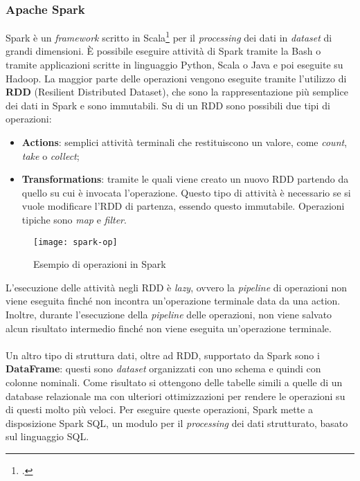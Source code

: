 \subsubsection{Apache Spark}
Spark è un \textit{framework} scritto in Scala\footcite{https://www.scala-lang.org/} per il \textit{processing} dei dati in \textit{dataset} di grandi dimensioni.
È possibile eseguire attività di Spark tramite la \gls{Bash} o tramite applicazioni scritte in linguaggio Python, Scala o Java e poi eseguite su Hadoop.
La maggior parte delle operazioni vengono eseguite tramite l'utilizzo di \textbf{RDD} (Resilient Distributed Dataset), che sono la rappresentazione più semplice dei dati in Spark e sono immutabili. Su di un RDD sono possibili due tipi di operazioni:
\begin{itemize}
	\item \textbf{Actions}: semplici attività terminali che restituiscono un valore, come \textit{count}, \textit{take} o \textit{collect}; 
	\item \textbf{Transformations}: tramite le quali viene creato un nuovo RDD partendo da quello su cui è invocata l'operazione. Questo tipo di attività è necessario se si vuole modificare l'RDD di partenza, essendo questo immutabile. Operazioni tipiche sono \textit{map} e \textit{filter}.
\end{itemize}
\begin{figure}[!h]
	\centering
	\texttt{[image: spark-op]}
	\caption{Esempio di operazioni in Spark}
\end{figure}
L'esecuzione delle attività negli RDD è \textit{lazy}, ovvero la \textit{pipeline} di operazioni non viene eseguita finché non incontra un'operazione terminale data da una action. Inoltre, durante l'esecuzione della \textit{pipeline} delle operazioni, non viene salvato alcun risultato intermedio finché non viene eseguita un'operazione terminale.\\\\
Un altro tipo di struttura dati, oltre ad RDD, supportato da Spark sono i \textbf{DataFrame}: questi sono \textit{dataset} organizzati con uno schema e quindi con colonne nominali. Come risultato si ottengono delle tabelle simili a quelle di un database relazionale ma con ulteriori ottimizzazioni per rendere le operazioni su di questi molto più veloci. Per eseguire queste operazioni, Spark mette a disposizione Spark SQL, un modulo per il \textit{processing} dei dati strutturato, basato sul linguaggio SQL.
\newpage
